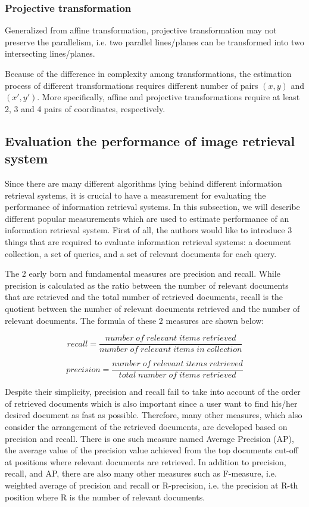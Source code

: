 \subsubsection{Projective transformation} Generalized from affine transformation, projective transformation may not preserve the parallelism, i.e. two parallel lines/planes can be transformed into two intersecting lines/planes.

Because of the difference in complexity among transformations, the estimation process of different transformations requires different number of pairs $(x, y)$ and $(x', y')$. More specifically, affine and projective transformations require at least 2, 3 and 4 pairs of coordinates, respectively.


\subsection{Evaluation the performance of image retrieval system} \label{section:evaluation_ir_sys}

Since there are many different algorithms lying behind different information retrieval systems, it is crucial to have a measurement for evaluating the performance of information retrieval systems. In this subsection, we will describe different popular measurements which are used to estimate performance of an information retrieval system. First of all, the authors would like to introduce 3 things that are required to evaluate information retrieval systems: a document collection, a set of queries, and a set of relevant documents for each query.

The 2 early born and fundamental measures are precision and recall. While precision is calculated as the ratio between the number of relevant documents that are retrieved and the total number of retrieved documents, recall is the quotient between the number of relevant documents retrieved and the number of relevant documents. The formula of these 2 measures are shown below:

\begin{equation}
recall = \frac{number\;of\;relevant\;items\;retrieved}{number\;of\;relevant\;items\;in\;collection}
\end{equation}

\begin{equation}
precision = \frac{number\;of\;relevant\;items\;retrieved}{total\;number\;of\;items\;retrieved}
\end{equation}

Despite their simplicity, precision and recall fail to take into account of the order of retrieved documents which is also important since a user want to find his/her desired document as fast as possible. Therefore, many other measures, which also consider the arrangement of the retrieved documents, are developed based on precision and recall. There is one such measure named Average Precision (AP), the average value of the precision value achieved from the top documents cut-off at positions where relevant documents are retrieved. In addition to precision, recall, and AP, there are also many other measures such as F-measure, i.e. weighted average of precision and recall or R-precision, i.e. the precision at R-th position where R is the number of relevant documents.

